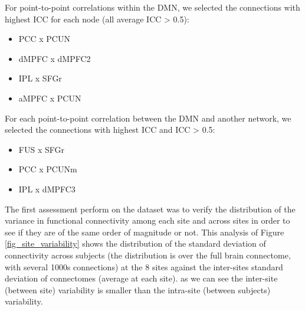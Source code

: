 For point-to-point correlations within the DMN, we selected the connections with highest ICC for each node (all average ICC > 0.5):
\begin{itemize}
\item PCC x PCUN
\item dMPFC x dMPFC2
\item IPL x SFGr
\item aMPFC x PCUN
\end{itemize}
For each point-to-point correlation between the DMN and another network, we selected the connections with highest ICC and ICC > 0.5:
\begin{itemize}
\item FUS x SFGr
\item PCC x PCUNm
\item IPL x dMPFC3
\end{itemize}


The first assessment perform on the dataset was to verify the distribution of the variance in functional connectivity among each site and across sites in order to see if they are of the same order of magnitude or not. This analysis of Figure \ref{fig_site_variability} shows the distribution of the standard deviation of connectivity across subjects (the distribution is over the full brain connectome, with several 1000s connections) at the 8 sites against the inter-sites standard deviation of connectomes (average at each site). as we can see the inter-site (between site) variability is smaller than the intra-site (between subjects) variability.

